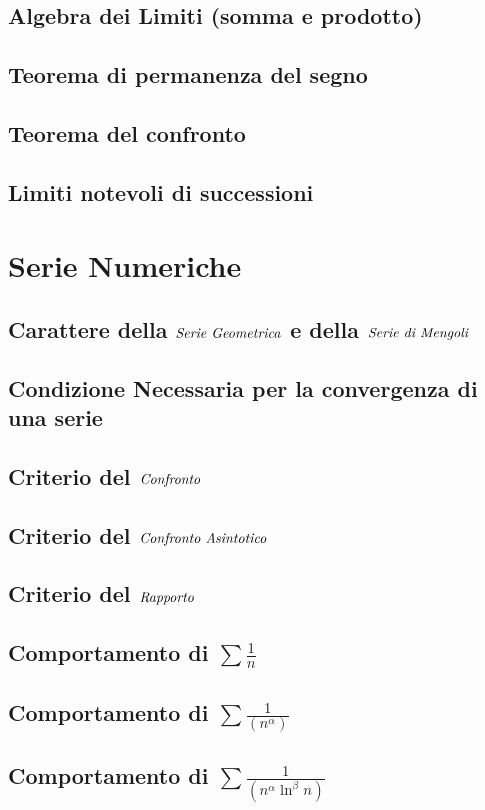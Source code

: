 \documentclass[11pt, a4paper]{book}
\begin{document}
\section{Algebra dei Limiti (somma e prodotto)}
\section{Teorema di permanenza del segno}
\section{Teorema del confronto}
\section{Limiti notevoli di successioni}

\chapter{Serie Numeriche}
\section{Carattere della $\emph{Serie Geometrica}$ e della $\emph{Serie di Mengoli}$}
\section{Condizione Necessaria per la convergenza di una serie}
\section{Criterio del $\emph{Confronto}$}
\section{Criterio del $\emph{Confronto Asintotico}$}
\section{Criterio del $\emph{Rapporto}$}
\section{Comportamento di $\sum\frac{1}{n}$}
\section{Comportamento di $\sum\frac{1}{(n^\alpha)}$}
\section{Comportamento di $\sum\frac{1}{(n^\alpha\ln^\beta n)}$}
\end{document}
